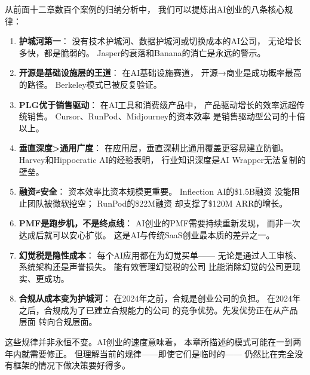\begin{corebox}
从前面十二章数百个案例的归纳分析中，
我们可以提炼出AI创业的八条核心规律：

\begin{enumerate}
  \item \textbf{护城河第一}：
    没有技术护城河、数据护城河或切换成本的AI公司，
    无论增长多快，都是脆弱的。
    Jasper的衰落和Banana的消亡是永远的警示。

  \item \textbf{开源是基础设施层的王道}：
    在AI基础设施赛道，
    开源→商业是成功概率最高的路径。
    Berkeley模式已被反复验证。

  \item \textbf{PLG优于销售驱动}：
    在AI工具和消费级产品中，
    产品驱动增长的效率远超传统销售。
    Cursor、RunPod、Midjourney的资本效率
    是销售驱动型公司的十倍以上。

  \item \textbf{垂直深度>通用广度}：
    在应用层，垂直深耕比通用覆盖更容易建立防御。
    Harvey和Hippocratic AI的经验表明，
    行业知识深度是AI Wrapper无法复制的壁垒。

  \item \textbf{融资≠安全}：
    资本效率比资本规模更重要。
    Inflection AI的\$1.5B融资
    没能阻止团队被微软挖空；
    RunPod的\$22M融资
    却支撑了\$120M ARR的增长。

  \item \textbf{PMF是跑步机，不是终点线}：
    AI创业的PMF需要持续重新发现，
    而非一次达成后就可以安心扩张。
    这是AI与传统SaaS创业最本质的差异之一。

  \item \textbf{幻觉税是隐性成本}：
    每个AI应用都在为幻觉买单——
    无论是通过人工审核、系统架构还是声誉损失。
    能有效管理幻觉税的公司
    比能消除幻觉的公司更现实、更成功。

  \item \textbf{合规从成本变为护城河}：
    在2024年之前，合规是创业公司的负担。
    在2024年之后，合规成为了已建立合规能力的公司
    的竞争优势。先发优势正在从产品层面
    转向合规层面。
\end{enumerate}
\end{corebox}

这些规律并非永恒不变。AI创业的速度意味着，
本章所描述的模式可能在一到两年内就需要修正。
但理解当前的规律——即使它们是临时的——
仍然比在完全没有框架的情况下做决策要好得多。

\bigskip

